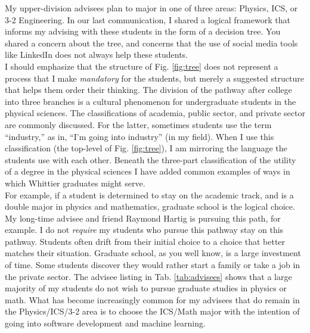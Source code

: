 \documentclass[../../main.tex]{subfiles}
\begin{document}
My upper-division advisees plan to major in one of three areas: Physics, ICS, or 3-2 Engineering.  In our last communication, I shared a logical framework that informs my advising with these students in the form of a decision tree.  You shared a concern about the tree, and concerns that the use of social media tools like LinkedIn does not always help these students.
\\
\vspace{0.15cm}
I should emphasize that the structure of Fig. \ref{fig:tree} does not represent a process that I make \textit{mandatory} for the students, but merely a suggested structure that helps them order their thinking.  The division of the pathway after college into three branches is a cultural phenomenon for undergraduate students in the physical sciences.  The classifications of academia, public sector, and private sector are commonly discussed.  For the latter, sometimes students use the term ``industry,'' as in, ``I'm going into industry'' (in my field).  When I use this classification (the top-level of Fig. \ref{fig:tree}), I am mirroring the language the students use with each other.  Beneath the three-part classification of the utility of a degree in the physical sciences I have added common examples of ways in which Whittier graduates might serve.
\\
\vspace{0.15cm}
For example, if a student is determined to stay on the academic track, and is a double major in physics and mathematics, graduate school is the logical choice.  My long-time advisee and friend Raymond Hartig is pursuing this path, for example.  I do not \textit{require} my students who pursue this pathway stay on this pathway.  Students often drift from their initial choice to a choice that better matches their situation.  Graduate school, as you well know, is a large investment of time.  Some students discover they would rather start a family or take a job in the private sector.  The advisee listing in Tab. \ref{tab:advisees} shows that a large majority of my students do not wish to pursue graduate studies in physics or math.  What has become increasingly common for my advisees that do remain in the Physics/ICS/3-2 area is to choose the ICS/Math major with the intention of going into software development and machine learning.
\\
\vspace{0.15cm}
\end{document}
